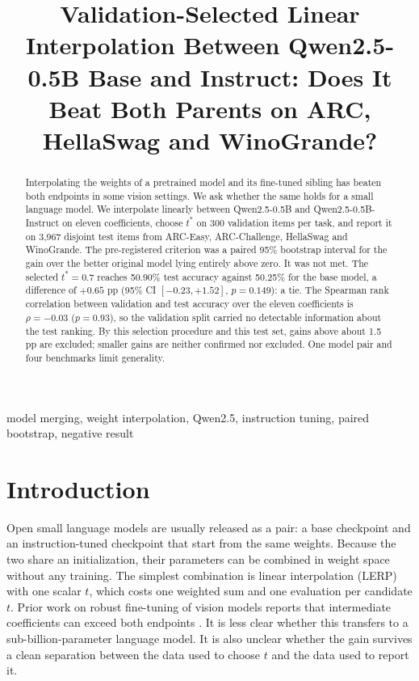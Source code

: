 \documentclass[conference]{IEEEtran}
\begin{document}
\title{Validation-Selected Linear Interpolation Between Qwen2.5-0.5B Base and Instruct: Does It Beat Both Parents on ARC, HellaSwag and WinoGrande?}

\author{
}

\maketitle

\begin{abstract}
Interpolating the weights of a pretrained model and its fine-tuned sibling has beaten both endpoints in some vision settings. We ask whether the same holds for a small language model. We interpolate linearly between Qwen2.5-0.5B and Qwen2.5-0.5B-Instruct on eleven coefficients, choose $t^\ast$ on 300 validation items per task, and report it on 3{,}967 disjoint test items from ARC-Easy, ARC-Challenge, HellaSwag and WinoGrande. The pre-registered criterion was a paired 95\% bootstrap interval for the gain over the better original model lying entirely above zero. It was not met. The selected $t^\ast=0.7$ reaches 50.90\% test accuracy against 50.25\% for the base model, a difference of $+0.65$ pp (95\% CI $[-0.23,+1.52]$, $p=0.149$): a tie. The Spearman rank correlation between validation and test accuracy over the eleven coefficients is $\rho=-0.03$ ($p=0.93$), so the validation split carried no detectable information about the test ranking. By this selection procedure and this test set, gains above about 1.5 pp are excluded; smaller gains are neither confirmed nor excluded. One model pair and four benchmarks limit generality.
\end{abstract}

\begin{IEEEkeywords}
model merging, weight interpolation, Qwen2.5, instruction tuning, paired bootstrap, negative result
\end{IEEEkeywords}

\section{Introduction}
Open small language models are usually released as a pair: a base checkpoint and an instruction-tuned checkpoint that start from the same weights. Because the two share an initialization, their parameters can be combined in weight space without any training. The simplest combination is linear interpolation (LERP) with one scalar $t$, which costs one weighted sum and one evaluation per candidate $t$. Prior work on robust fine-tuning of vision models reports that intermediate coefficients can exceed both endpoints \cite{wortsman2022wise}. It is less clear whether this transfers to a sub-billion-parameter language model. It is also unclear whether the gain survives a clean separation between the data used to choose $t$ and the data used to report it.
\end{document}
